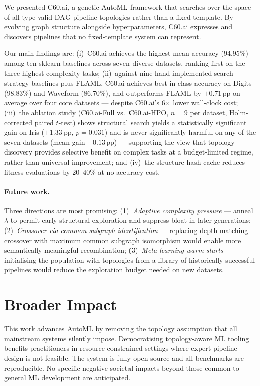 \documentclass{article}
\theoremstyle{definition}
\theoremstyle{plain}
\theoremstyle{remark}
\begin{document}
We presented C60.ai, a genetic AutoML framework that searches over the space
of all type-valid DAG pipeline topologies rather than a fixed template.
By evolving graph structure alongside hyperparameters, C60.ai expresses and
discovers pipelines that no fixed-template system can represent.

Our main findings are:
(i)~C60.ai achieves the highest mean accuracy (94.95\%) among ten sklearn
baselines across seven diverse datasets, ranking first on the three
highest-complexity tasks;
(ii)~against nine hand-implemented search strategy baselines plus FLAML,
C60.ai achieves best-in-class accuracy on Digits (98.83\%) and Waveform
(86.70\%), and outperforms FLAML by $+0.71$\,pp on average over four
core datasets — despite C60.ai's 6$\times$ lower wall-clock cost;
(iii)~the ablation study (C60.ai-Full vs.\ C60.ai-HPO, $n{=}9$ per
dataset, Holm-corrected paired $t$-test) shows structural search yields
a statistically significant gain on Iris ($+1.33$\,pp, $p{=}0.031$)
and is never significantly harmful on any of the seven datasets
(mean gain $+0.13$\,pp) — supporting the view that topology discovery
provides selective benefit on complex tasks at a budget-limited regime,
rather than universal improvement; and
(iv)~the structure-hash cache reduces fitness evaluations by 20--40\% at
no accuracy cost.

\paragraph{Future work.}
Three directions are most promising:
(1)~\emph{Adaptive complexity pressure} — anneal $\lambda$ to permit early
structural exploration and suppress bloat in later generations;
(2)~\emph{Crossover via common subgraph identification} — replacing
depth-matching crossover with maximum common subgraph isomorphism would
enable more semantically meaningful recombination;
(3)~\emph{Meta-learning warm-starts} — initialising the population with
topologies from a library of historically successful pipelines would reduce
the exploration budget needed on new datasets.

\section*{Broader Impact}

This work advances AutoML by removing the topology assumption that all
mainstream systems silently impose.
Democratising topology-aware ML tooling benefits practitioners in
resource-constrained settings where expert pipeline design is not feasible.
The system is fully open-source and all benchmarks are reproducible.
No specific negative societal impacts beyond those common to general
ML development are anticipated.
\end{document}
